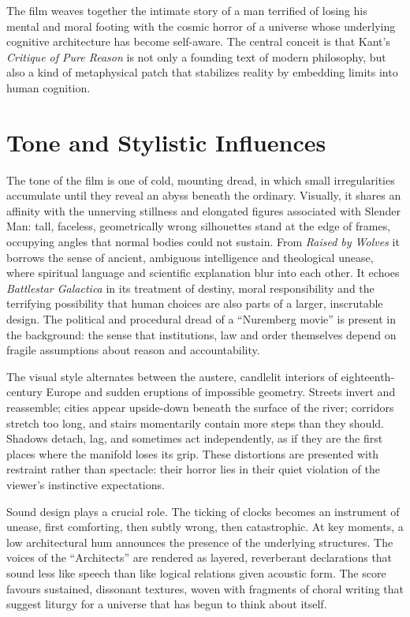 \documentclass[12pt]{article}
\begin{document}
The film weaves together the intimate story of a man terrified of losing his mental and moral footing with the cosmic horror of a universe whose underlying cognitive architecture has become self-aware. The central conceit is that Kant’s \emph{Critique of Pure Reason} is not only a founding text of modern philosophy, but also a kind of metaphysical patch that stabilizes reality by embedding limits into human cognition.

\section*{Tone and Stylistic Influences}

The tone of the film is one of cold, mounting dread, in which small irregularities accumulate until they reveal an abyss beneath the ordinary. Visually, it shares an affinity with the unnerving stillness and elongated figures associated with Slender Man: tall, faceless, geometrically wrong silhouettes stand at the edge of frames, occupying angles that normal bodies could not sustain. From \emph{Raised by Wolves} it borrows the sense of ancient, ambiguous intelligence and theological unease, where spiritual language and scientific explanation blur into each other. It echoes \emph{Battlestar Galactica} in its treatment of destiny, moral responsibility and the terrifying possibility that human choices are also parts of a larger, inscrutable design. The political and procedural dread of a “Nuremberg movie” is present in the background: the sense that institutions, law and order themselves depend on fragile assumptions about reason and accountability.

The visual style alternates between the austere, candlelit interiors of eighteenth-century Europe and sudden eruptions of impossible geometry. Streets invert and reassemble; cities appear upside-down beneath the surface of the river; corridors stretch too long, and stairs momentarily contain more steps than they should. Shadows detach, lag, and sometimes act independently, as if they are the first places where the manifold loses its grip. These distortions are presented with restraint rather than spectacle: their horror lies in their quiet violation of the viewer’s instinctive expectations.

Sound design plays a crucial role. The ticking of clocks becomes an instrument of unease, first comforting, then subtly wrong, then catastrophic. At key moments, a low architectural hum announces the presence of the underlying structures. The voices of the “Architects” are rendered as layered, reverberant declarations that sound less like speech than like logical relations given acoustic form. The score favours sustained, dissonant textures, woven with fragments of choral writing that suggest liturgy for a universe that has begun to think about itself.
\end{document}
